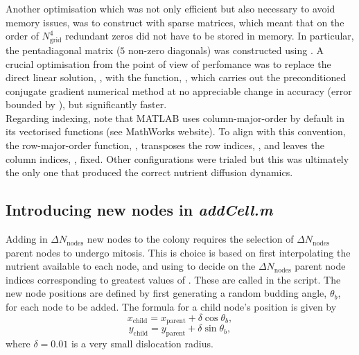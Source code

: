 Another optimisation which was not only efficient but also necessary to avoid
memory issues, was to construct  with sparse matrices, which 
meant that on the order of $N_{\textrm{grid}}^4$ redundant zeros did not have 
to be stored in memory. In particular, the pentadiagonal matrix ($5$ non-zero diagonals)
  was constructed using . A crucial optimisation 
from the point of view of perfomance was to 
replace the direct linear solution, , with the function, 
, which carries out the preconditioned conjugate 
gradient numerical method at no appreciable change in accuracy (error bounded by ),
but significantly faster.
\\

Regarding indexing, note that MATLAB uses column-major-order by default in 
its vectorised functions (see MathWorks website). To align with this convention,
the row-major-order function, , transposes the row indices, ,
and leaves the column indices, , fixed. Other configurations were 
trialed but this was ultimately the only one that produced the correct 
nutrient diffusion dynamics.

\subsection{Introducing new nodes in \textit{addCell.m}} \label{ssec:addCell}
Adding in $\Delta N_{\textrm{nodes}}$ new nodes to the colony requires the
selection of $\Delta N_{\textrm{nodes}}$ parent nodes to undergo 
mitosis. This is choice is based on first interpolating the nutrient 
available to each node, and using  to decide on the 
$\Delta N_{\textrm{nodes}}$ parent node indices corresponding to 
greatest values of . These are called 
 in the  script. 
The new node positions are defined by first generating a random 
budding angle, $\theta_b$, for each node to be added. The formula for 
a child node's position is given by 
\begin{equation*}
x_{\textrm{child}} = x_{\textrm{parent}} + \delta \cos{\theta_b},
\end{equation*}
\begin{equation*}
y_{\textrm{child}} = y_{\textrm{parent}} + \delta \sin{\theta_b},
\end{equation*}
where $\delta = 0.01$ is a very small dislocation radius.
\\

